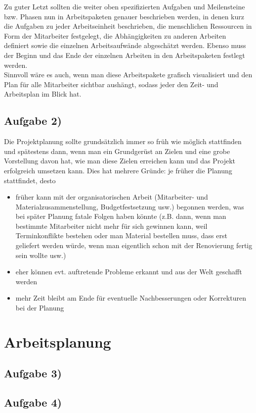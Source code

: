 \documentclass{swp1}
\begin{document}
Zu guter Letzt sollten die weiter oben spezifizierten Aufgaben und Meilensteine bzw. Phasen nun in Arbeitspaketen genauer beschrieben werden, in denen kurz die Aufgaben zu jeder Arbeitseinheit beschrieben, die menschlichen Ressourcen in Form der Mitarbeiter festgelegt, die Abhängigkeiten zu anderen Arbeiten definiert sowie die einzelnen Arbeitsaufwände abgeschätzt werden. Ebenso muss der Beginn und das Ende der einzelnen Arbeiten in den Arbeitspaketen festlegt werden.\\
Sinnvoll wäre es auch, wenn man diese Arbeitspakete grafisch visualisiert und den Plan für alle Mitarbeiter sichtbar aushängt, sodass jeder den Zeit- und Arbeitsplan im Blick hat.

\subsection*{Aufgabe 2)}

Die Projektplanung sollte grundsätzlich immer so früh wie möglich stattfinden und spätestens dann, wenn man ein Grundgerüst an Zielen und eine grobe Vorstellung davon hat, wie man diese Zielen erreichen kann und das Projekt erfolgreich umsetzen kann. Dies hat mehrere Gründe: je früher die Planung stattfindet, desto
\begin{itemize}
\item  früher kann mit der organisatorischen Arbeit (Mitarbeiter- und Materialzusammenstellung, Budgetfestsetzung usw.) begonnen werden, was bei später Planung fatale Folgen haben könnte (z.B. dann, wenn man bestimmte Mitarbeiter nicht mehr für sich gewinnen kann, weil Terminkonflikte bestehen oder man Material bestellen muss, dass erst geliefert werden würde, wenn man eigentlich schon mit der Renovierung fertig sein wollte usw.)
\item eher können evt. auftretende Probleme erkannt und aus der Welt geschafft werden
\item mehr Zeit bleibt am Ende für eventuelle Nachbesserungen oder Korrekturen bei der Planung
\end{itemize}
\newpage

\section*{Arbeitsplanung}          
\subsection*{Aufgabe 3)}
\subsection*{Aufgabe 4)}
\end{document}
